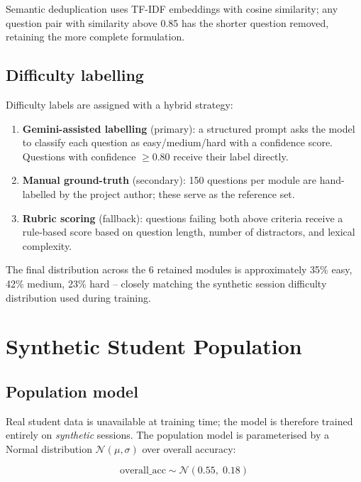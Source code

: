 \documentclass[12pt,a4paper]{article}
\begin{document}
Semantic deduplication uses TF-IDF embeddings with cosine similarity; any question
pair with similarity above 0.85 has the shorter question removed, retaining the more
complete formulation.

\subsection{Difficulty labelling}

Difficulty labels are assigned with a hybrid strategy:
\begin{enumerate}[noitemsep]
  \item \textbf{Gemini-assisted labelling} (primary): a structured prompt asks the
        model to classify each question as easy/medium/hard with a confidence score.
        Questions with confidence $\geq 0.80$ receive their label directly.
  \item \textbf{Manual ground-truth} (secondary): 150 questions per module are
        hand-labelled by the project author; these serve as the reference set.
  \item \textbf{Rubric scoring} (fallback): questions failing both above criteria
        receive a rule-based score based on question length, number of distractors,
        and lexical complexity.
\end{enumerate}

The final distribution across the 6 retained modules is approximately
35\% easy, 42\% medium, 23\% hard -- closely matching the synthetic session
difficulty distribution used during training.

\section{Synthetic Student Population}
\label{sec:population}

\subsection{Population model}

Real student data is unavailable at training time; the model is therefore trained
entirely on \emph{synthetic} sessions. The population model is parameterised by a
Normal distribution $\mathcal{N}(\mu,\sigma)$ over overall accuracy:

\[
  \text{overall\_acc} \sim \mathcal{N}(0.55,\;0.18)
\]
\end{document}
